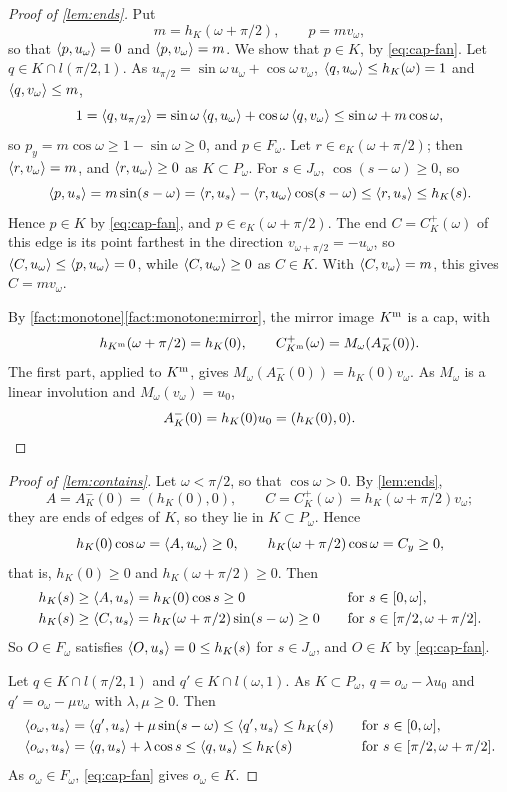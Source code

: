 \begin{proof}[Proof of \cref{lem:ends}]
Put
\[
  m=h_K(\omega+\pi/2),\qquad p=mv_\omega,
\]
so that $\langle p,u_\omega\rangle=0$ and $\langle p,v_\omega\rangle=m$. We show that $p\in K$, by
\eqref{eq:cap-fan}. Let $q\in K\cap l(\pi/2,1)$. As
$u_{\pi/2}=\sin\omega\,u_\omega+\cos\omega\,v_\omega$,
$\langle q,u_\omega\rangle\le h_K(\omega)=1$ and $\langle q,v_\omega\rangle\le m$,
\[
  1=\langle q,u_{\pi/2}\rangle=\sin\omega\,\langle q,u_\omega\rangle+\cos\omega\,\langle q,v_\omega\rangle
    \le\sin\omega+m\cos\omega ,
\]
so $p_y=m\cos\omega\ge1-\sin\omega\ge0$, and $p\in F_\omega$. Let $r\in
e_K(\omega+\pi/2)$; then $\langle r,v_\omega\rangle=m$, and $\langle r,u_\omega\rangle\ge0$ as
$K\subset P_\omega$. For $s\in J_\omega$, $\cos(s-\omega)\ge0$, so
\[
  \langle p,u_s\rangle=m\sin(s-\omega)=\langle r,u_s\rangle-\langle r,u_\omega\rangle\cos(s-\omega)
    \le\langle r,u_s\rangle\le h_K(s) .
\]
Hence $p\in K$ by \eqref{eq:cap-fan}, and $p\in e_K(\omega+\pi/2)$. The end
$C=C_K^+(\omega)$ of this edge is its point farthest in the direction
$v_{\omega+\pi/2}=-u_\omega$, so $\langle C,u_\omega\rangle\le\langle p,u_\omega\rangle=0$, while
$\langle C,u_\omega\rangle\ge0$ as $C\in K$. With $\langle C,v_\omega\rangle=m$, this gives
$C=mv_\omega$.

By \cref{fact:monotone}\ref{fact:monotone:mirror}, the mirror image $K^{\mathrm{m}}$
is a cap, with
\[
  h_{K^{\mathrm{m}}}(\omega+\pi/2)=h_K(0),\qquad
  C^+_{K^{\mathrm{m}}}(\omega)=M_\omega(A_K^-(0)).
\]
The first part, applied to $K^{\mathrm{m}}$, gives
$M_\omega(A_K^-(0))=h_K(0)v_\omega$. As $M_\omega$ is a linear involution and
$M_\omega(v_\omega)=u_0$,
\[
  A_K^-(0)=h_K(0)u_0=(h_K(0),0).\qedhere
\]
\end{proof}

\begin{proof}[Proof of \cref{lem:contains}]
Let $\omega<\pi/2$, so that $\cos\omega>0$. By \cref{lem:ends},
\[
  A=A_K^-(0)=(h_K(0),0),\qquad C=C_K^+(\omega)=h_K(\omega+\pi/2)v_\omega;
\]
they are ends of edges of $K$, so they lie in $K\subset P_\omega$. Hence
\[
  h_K(0)\cos\omega=\langle A,u_\omega\rangle\ge0,\qquad
  h_K(\omega+\pi/2)\cos\omega=C_y\ge0,
\]
that is, $h_K(0)\ge0$ and $h_K(\omega+\pi/2)\ge0$. Then
\begin{alignat*}{2}
  h_K(s)&\ge\langle A,u_s\rangle=h_K(0)\cos s\ge0&\quad&\text{for }s\in[0,\omega],\\
  h_K(s)&\ge\langle C,u_s\rangle=h_K(\omega+\pi/2)\sin(s-\omega)\ge0&&
    \text{for }s\in[\pi/2,\omega+\pi/2].
\end{alignat*}
So $O\in F_\omega$ satisfies $\langle O,u_s\rangle=0\le h_K(s)$ for $s\in J_\omega$, and
$O\in K$ by \eqref{eq:cap-fan}.

Let $q\in K\cap l(\pi/2,1)$ and $q'\in K\cap l(\omega,1)$. As $K\subset
P_\omega$, $q=o_\omega-\lambda u_0$ and $q'=o_\omega-\mu v_\omega$ with
$\lambda,\mu\ge0$. Then
\begin{alignat*}{2}
  \langle o_\omega,u_s\rangle&=\langle q',u_s\rangle+\mu\sin(s-\omega)\le\langle q',u_s\rangle\le h_K(s)
    &\quad&\text{for }s\in[0,\omega],\\
  \langle o_\omega,u_s\rangle&=\langle q,u_s\rangle+\lambda\cos s\le\langle q,u_s\rangle\le h_K(s)
    &&\text{for }s\in[\pi/2,\omega+\pi/2].
\end{alignat*}
As $o_\omega\in F_\omega$, \eqref{eq:cap-fan} gives $o_\omega\in K$.
\end{proof}

